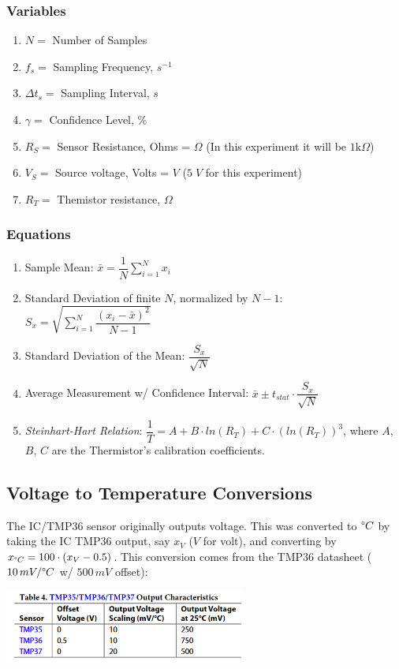 \documentclass{article}
\begin{document}
\subsubsection*{Variables}
\begin{enumerate}[label = \roman*.]
    \item \(N = \) Number of Samples
    \item \(f_{s} = \) Sampling Frequency, $s^{-1}$
    \item \(\Delta t_{s} = \) Sampling Interval, $s$
    \item \(\gamma = \) Confidence Level, \%
    \item \(R_{S} = \) Sensor Resistance, Ohms = $\Omega$ (In this experiment it will be $1\text{k}\Omega$)
    \item \(V_{S} = \) Source voltage, Volts = $V$ ($5\;V$ for this experiment)
    \item \(R_{T} = \) Themistor resistance, $\Omega$
\end{enumerate}

\subsubsection*{Equations}
\begin{enumerate}[label = \Roman*.]
    \item Sample Mean: \(\bar{x} = \dfrac{1}{N}\displaystyle\sum_{i=1}^{N} x_{i}\) 
    \item Standard Deviation of finite $N$, normalized by $N-1$: \(S_{x} = \sqrt{\displaystyle\sum_{i=1}^{N} \dfrac{(x_{i} - \bar{x})^{2}}{N-1}}\)
    \item Standard Deviation of the Mean: \(\dfrac{S_{x}}{\sqrt{N}}\)
    \item Average Measurement w/ Confidence Interval: \(\bar{x} \pm t_{stat}\cdot \dfrac{S_{x}}{\sqrt{N}}\)
    \item \textit{Steinhart-Hart Relation}: \(\dfrac{1}{T} = A + B\cdot ln(R_{T}) + C\cdot (ln(R_{T}))^{3}\), where $A$, $B$, $C$ are the Thermistor's calibration coefficients.
\end{enumerate}  

\subsection*{Voltage to Temperature Conversions}
The IC/TMP36 sensor originally outputs voltage. This was converted to $\degree C$ by taking the IC TMP36 output, say $x_{V}$ ($V$ for volt), and converting by $x_{\degree C} = 100\cdot(x_{V}-0.5)$. This conversion comes from the TMP36 datasheet ($10\,mV/\degree C$ w/ $500\,mV$ offset):
\begin{center}
    \href{https://www.analog.com/media/en/technical-documentation/data-sheets/tmp35_36_37.pdf}{\includegraphics[width = 0.6\textwidth]{lab2images/tmp36_offset_documentation.png}}
\end{center}
\end{document}
